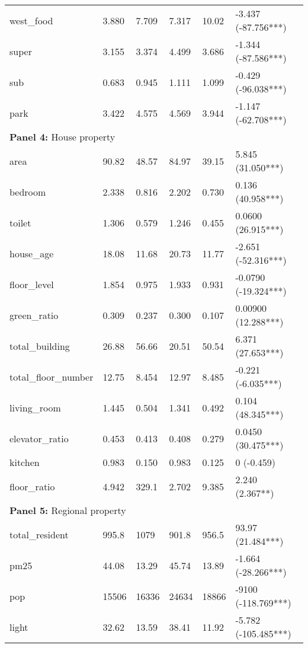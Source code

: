 \begin{tabular}{llllll}
west\_food & 3.880 & 7.709 & 7.317 & 10.02 & -3.437 (-87.756***) \\
super & 3.155 & 3.374 & 4.499 & 3.686 & -1.344 (-87.586***) \\
sub & 0.683 & 0.945 & 1.111 & 1.099 & -0.429 (-96.038***) \\
park & 3.422 & 4.575 & 4.569 & 3.944 & -1.147 (-62.708***) \\
\multicolumn{6}{l}{\textbf{Panel 4: }House property} \\
area & 90.82 & 48.57 & 84.97 & 39.15 & 5.845 (31.050***) \\
bedroom & 2.338 & 0.816 & 2.202 & 0.730 & 0.136 (40.958***) \\
toilet & 1.306 & 0.579 & 1.246 & 0.455 & 0.0600 (26.915***) \\
house\_age & 18.08 & 11.68 & 20.73 & 11.77 & -2.651 (-52.316***) \\
floor\_level & 1.854 & 0.975 & 1.933 & 0.931 & -0.0790 (-19.324***) \\
green\_ratio & 0.309 & 0.237 & 0.300 & 0.107 & 0.00900 (12.288***) \\
total\_building & 26.88 & 56.66 & 20.51 & 50.54 & 6.371 (27.653***) \\
total\_floor\_number & 12.75 & 8.454 & 12.97 & 8.485 & -0.221 (-6.035***) \\
living\_room & 1.445 & 0.504 & 1.341 & 0.492 & 0.104 (48.345***) \\
elevator\_ratio & 0.453 & 0.413 & 0.408 & 0.279 & 0.0450 (30.475***) \\
kitchen & 0.983 & 0.150 & 0.983 & 0.125 & 0 (-0.459) \\
floor\_ratio & 4.942 & 329.1 & 2.702 & 9.385 & 2.240 (2.367**) \\
\multicolumn{6}{l}{\textbf{Panel 5: }Regional property} \\
total\_resident & 995.8 & 1079 & 901.8 & 956.5 & 93.97 (21.484***) \\
pm25 & 44.08 & 13.29 & 45.74 & 13.89 & -1.664 (-28.266***) \\
pop & 15506 & 16336 & 24634 & 18866 & -9100 (-118.769***) \\
light & 32.62 & 13.59 & 38.41 & 11.92 & -5.782 (-105.485***) \\
\bottomrule
\end{tabular}
